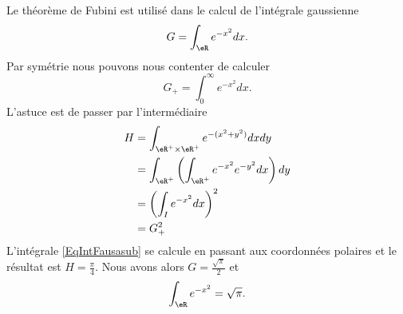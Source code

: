 \begin{example}
    Le théorème de Fubini est utilisé dans le calcul de l'intégrale gaussienne
    \begin{equation}
        G=\int_{\eR} e^{-x^2}dx.
    \end{equation}
    Par symétrie nous pouvons nous contenter de calculer
    \begin{equation}
        G_+=\int_0^{\infty} e^{-x^2}dx.
    \end{equation}
    L'astuce est de passer par l'intermédiaire
    \begin{subequations}
        \begin{align}
            H&=\int_{\eR^+\times\eR^+} e^{-(x^2+y^2)}dxdy       \label{EqIntFausasub}\\
            &=\int_{\eR^+}\left( \int_{\eR^+} e^{-x^2} e^{-y^2}dx \right)dy\\
            &=\left( \int_I e^{-x^2} dx\right)^2\\
            &=G_+^2
        \end{align}
    \end{subequations}
    L'intégrale \eqref{EqIntFausasub} se calcule en passant aux coordonnées polaires et le résultat est \( H=\frac{ \pi }{ 4 }\). Nous avons alors \( G=\frac{ \sqrt{\pi} }{ 2 }\) et
    \begin{equation}
        \int_{\eR} e^{-x^2}=\sqrt{\pi}.
    \end{equation}
\end{example}

